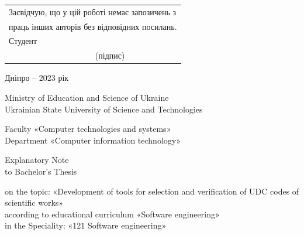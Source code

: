 \documentclass[14pt]{extarticle}
\begin{document}
\begin{spacing}{1}
\vspace{\baselineskip}
\vspace{\baselineskip}
\vspace{\baselineskip}
\vspace{\baselineskip}
\vspace{\baselineskip}
\vspace{\baselineskip}

\begin{flushright}
  \begin{tabular}{ll}
    \multicolumn{2}{l}{Засвідчую, що у цій роботі немає запозичень з}\\
    \multicolumn{2}{l}{праць інших авторів без відповідних посилань.}\\
    Студент & \\ \cline{2-2}
            & \fontsize{10}{10}\selectfont(підпис) \\
  \end{tabular}
\end{flushright}

\vspace*{\fill}
\centerline{Дніпро – 2023 рік}
\end{spacing}

\thispagestyle{empty}

\newpage

\begin{spacing}{1}
\begin{center}
  Ministry of Education and Science of Ukraine \\
  Ukrainian State University of Science and Technologies

  \vspace{\baselineskip}

  Faculty «Computer technologies and systems»\\
  Department «Computer information technology»\\

  \vspace{\baselineskip}

  {\fontsize{18}{18}\selectfont Explanatory Note}\\
  to Bachelor's Thesis\\

  \vspace{\baselineskip}
\end{center}
on the topic: «Development of tools for selection and
verification of UDC codes of scientific works»\\
according to educational curriculum «Software engineering»\\
in the Speciality: «121 Software engineering»\\
\end{spacing}
\end{document}
